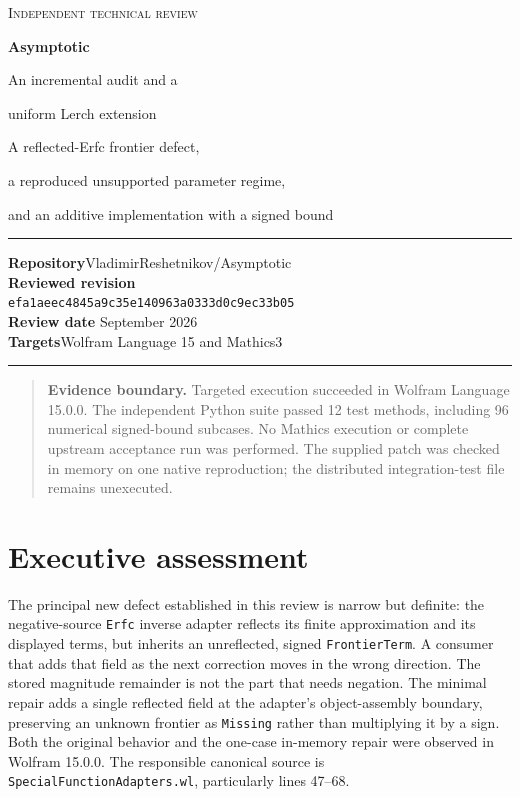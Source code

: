 \documentclass[11pt,a4paper]{article}
\newcommand{\code}[1]{\nolinkurl{#1}}
\newcommand{\commit}{\texttt{efa1aeec4845a9c35e140963a0333d0c9ec33b05}}
\newenvironment{scopebox}{\begin{quote}\small\color{ink}}{\end{quote}}
\begin{document}
\begin{titlepage}
\vspace*{12mm}
{\color{accent}\Large\textsc{Independent technical review}\par}
\vspace{12mm}
{\color{ink}\Huge\bfseries Asymptotic\par}
\vspace{5mm}
{\color{ink}\LARGE An incremental audit and a\par uniform Lerch extension\par}
\vspace{10mm}
{\Large A reflected-Erfc frontier defect,\par a reproduced unsupported parameter regime,\par and an additive implementation with a signed bound\par}
\vspace{15mm}
\rule{\textwidth}{0.6pt}\par
\vspace{5mm}
\textbf{Repository}\quad VladimirReshetnikov/Asymptotic\\[4pt]
\textbf{Reviewed revision}\\[3pt]
{\small\commit}\\[8pt]
\textbf{Review date} September 2026\\[6pt]
\textbf{Targets}\quad Wolfram Language 15 and Mathics3\par
\vspace{6mm}
\rule{\textwidth}{0.6pt}\par
\vfill
\begin{scopebox}
\textbf{Evidence boundary.} Targeted execution succeeded in Wolfram Language
15.0.0. The independent Python suite passed 12 test methods, including 96
numerical signed-bound subcases. No Mathics execution or complete upstream
acceptance run was performed. The supplied patch was checked in memory on one
native reproduction; the distributed integration-test file remains unexecuted.
\end{scopebox}
\end{titlepage}

\begingroup
\small
\tableofcontents
\endgroup
\newpage

\section{Executive assessment}

The principal new defect established in this review is narrow but definite:
the negative-source \code{Erfc} inverse adapter reflects its finite
approximation and its displayed terms, but inherits an unreflected, signed
\code{FrontierTerm}. A consumer that adds that field as the next correction
moves in the wrong direction. The stored magnitude remainder is not the part
that needs negation. The minimal repair adds a single reflected field at the
adapter's object-assembly boundary, preserving an unknown frontier as
\code{Missing} rather than multiplying it by a sign. Both the original behavior
and the one-case in-memory repair were observed in Wolfram 15.0.0.
The responsible canonical source is \code{SpecialFunctionAdapters.wl},
particularly lines 47--68.\cite{adapters}
\end{document}
